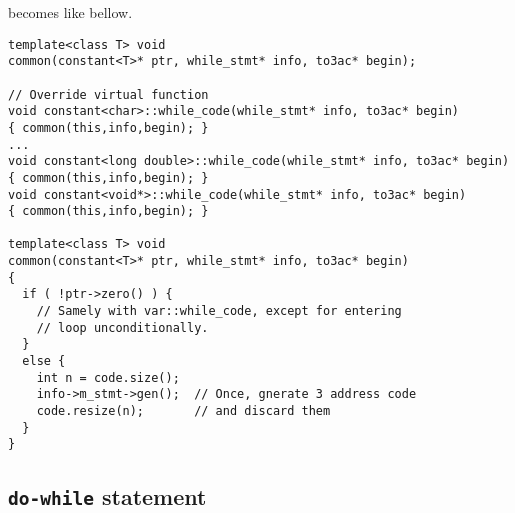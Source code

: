 becomes like bellow.
\begin{verbatim}
template<class T> void
common(constant<T>* ptr, while_stmt* info, to3ac* begin);

// Override virtual function
void constant<char>::while_code(while_stmt* info, to3ac* begin)
{ common(this,info,begin); }
...
void constant<long double>::while_code(while_stmt* info, to3ac* begin)
{ common(this,info,begin); }
void constant<void*>::while_code(while_stmt* info, to3ac* begin)
{ common(this,info,begin); }

template<class T> void
common(constant<T>* ptr, while_stmt* info, to3ac* begin)
{
  if ( !ptr->zero() ) {
    // Samely with var::while_code, except for entering
    // loop unconditionally.
  }
  else {
    int n = code.size();
    info->m_stmt->gen();  // Once, gnerate 3 address code
    code.resize(n);       // and discard them
  }
}
\end{verbatim}

\subsection{{\tt{do-while}} statement}

